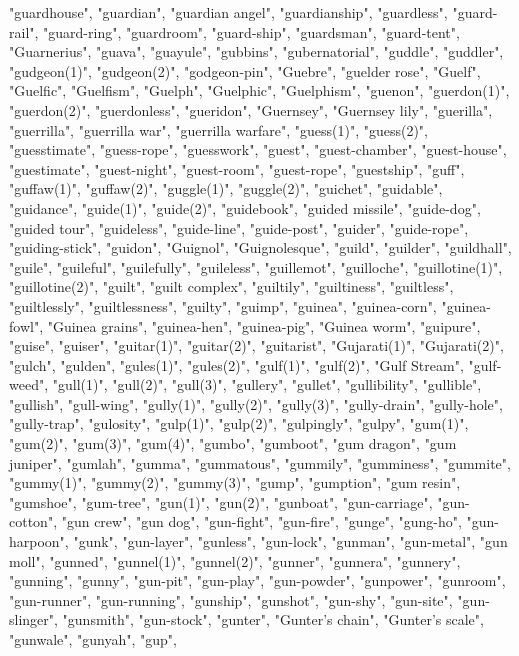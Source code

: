 "guardhouse",
"guardian",
"guardian angel",
"guardianship",
"guardless",
"guard-rail",
"guard-ring",
"guardroom",
"guard-ship",
"guardsman",
"guard-tent",
"Guarnerius",
"guava",
"guayule",
"gubbins",
"gubernatorial",
"guddle",
"guddler",
"gudgeon(1)",
"gudgeon(2)",
"godgeon-pin",
"Guebre",
"guelder rose",
"Guelf",
"Guelfic",
"Guelfism",
"Guelph",
"Guelphic",
"Guelphism",
"guenon",
"guerdon(1)",
"guerdon(2)",
"guerdonless",
"gueridon",
"Guernsey",
"Guernsey lily",
"guerilla",
"guerrilla",
"guerrilla war",
"guerrilla warfare",
"guess(1)",
"guess(2)",
"guesstimate",
"guess-rope",
"guesswork",
"guest",
"guest-chamber",
"guest-house",
"guestimate",
"guest-night",
"guest-room",
"guest-rope",
"guestship",
"guff",
"guffaw(1)",
"guffaw(2)",
"guggle(1)",
"guggle(2)",
"guichet",
"guidable",
"guidance",
"guide(1)",
"guide(2)",
"guidebook",
"guided missile",
"guide-dog",
"guided tour",
"guideless",
"guide-line",
"guide-post",
"guider",
"guide-rope",
"guiding-stick",
"guidon",
"Guignol",
"Guignolesque",
"guild",
"guilder",
"guildhall",
"guile",
"guileful",
"guilefully",
"guileless",
"guillemot",
"guilloche",
"guillotine(1)",
"guillotine(2)",
"guilt",
"guilt complex",
"guiltily",
"guiltiness",
"guiltless",
"guiltlessly",
"guiltlessness",
"guilty",
"guimp",
"guinea",
"guinea-corn",
"guinea-fowl",
"Guinea grains",
"guinea-hen",
"guinea-pig",
"Guinea worm",
"guipure",
"guise",
"guiser",
"guitar(1)",
"guitar(2)",
"guitarist",
"Gujarati(1)",
"Gujarati(2)",
"gulch",
"gulden",
"gules(1)",
"gules(2)",
"gulf(1)",
"gulf(2)",
"Gulf Stream",
"gulf-weed",
"gull(1)",
"gull(2)",
"gull(3)",
"gullery",
"gullet",
"gullibility",
"gullible",
"gullish",
"gull-wing",
"gully(1)",
"gully(2)",
"gully(3)",
"gully-drain",
"gully-hole",
"gully-trap",
"gulosity",
"gulp(1)",
"gulp(2)",
"gulpingly",
"gulpy",
"gum(1)",
"gum(2)",
"gum(3)",
"gum(4)",
"gumbo",
"gumboot",
"gum dragon",
"gum juniper",
"gumlah",
"gumma",
"gummatous",
"gummily",
"gumminess",
"gummite",
"gummy(1)",
"gummy(2)",
"gummy(3)",
"gump",
"gumption",
"gum resin",
"gumshoe",
"gum-tree",
"gun(1)",
"gun(2)",
"gunboat",
"gun-carriage",
"gun-cotton",
"gun crew",
"gun dog",
"gun-fight",
"gun-fire",
"gunge",
"gung-ho",
"gun-harpoon",
"gunk",
"gun-layer",
"gunless",
"gun-lock",
"gunman",
"gun-metal",
"gun moll",
"gunned",
"gunnel(1)",
"gunnel(2)",
"gunner",
"gunnera",
"gunnery",
"gunning",
"gunny",
"gun-pit",
"gun-play",
"gun-powder",
"gunpower",
"gunroom",
"gun-runner",
"gun-running",
"gunship",
"gunshot",
"gun-shy",
"gun-site",
"gun-slinger",
"gunsmith",
"gun-stock",
"gunter",
"Gunter's chain",
"Gunter's scale",
"gunwale",
"gunyah",
"gup",
